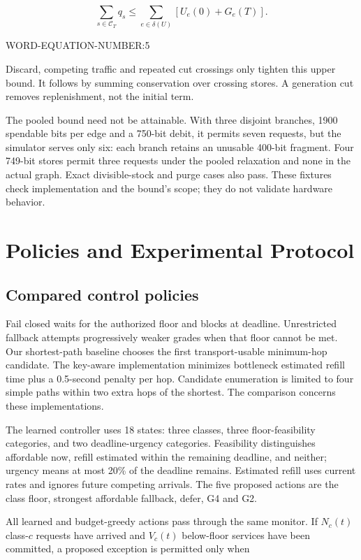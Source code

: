 \documentclass[conference,a4paper]{IEEEtran}
\begin{document}
\[
\sum_{s\in\mathcal C_T}q_s
\leq\sum_{e\in\delta(U)}\left[U_e(0)+G_e(T)\right].
\]

WORD-EQUATION-NUMBER:5


Discard, competing traffic and repeated cut crossings only tighten this upper bound. It follows by summing conservation over crossing stores. A generation cut removes replenishment, not the initial term.

The pooled bound need not be attainable. With three disjoint branches, 1900 spendable bits per edge and a 750-bit debit, it permits seven requests, but the simulator serves only six: each branch retains an unusable 400-bit fragment. Four 749-bit stores permit three requests under the pooled relaxation and none in the actual graph. Exact divisible-stock and purge cases also pass. These fixtures check implementation and the bound's scope; they do not validate hardware behavior.

\section{Policies and Experimental Protocol}\label{sec:protocol}
\subsection{Compared control policies}
Fail closed waits for the authorized floor and blocks at deadline. Unrestricted fallback attempts progressively weaker grades when that floor cannot be met. Our shortest-path baseline chooses the first transport-usable minimum-hop candidate. The key-aware implementation minimizes bottleneck estimated refill time plus a 0.5-second penalty per hop. Candidate enumeration is limited to four simple paths within two extra hops of the shortest. The comparison concerns these implementations.

The learned controller uses 18 states: three classes, three floor-feasibility categories, and two deadline-urgency categories. Feasibility distinguishes affordable now, refill estimated within the remaining deadline, and neither; urgency means at most 20\% of the deadline remains. Estimated refill uses current rates and ignores future competing arrivals. The five proposed actions are the class floor, strongest affordable fallback, defer, G4 and G2.

All learned and budget-greedy actions pass through the same monitor. If $N_c(t)$ class-$c$ requests have arrived and $V_c(t)$ below-floor services have been committed, a proposed exception is permitted only when
\end{document}

